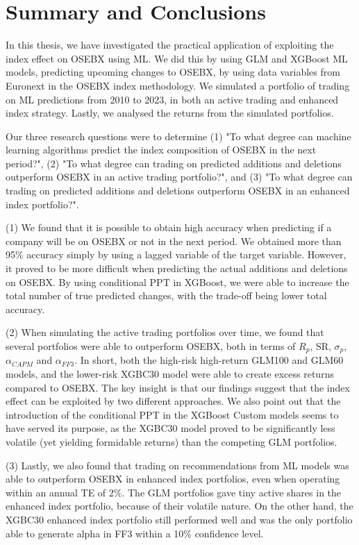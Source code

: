 \section{Summary and Conclusions}
\label{Summary and conclusions}

In this thesis, we have investigated the practical application of exploiting the index effect on OSEBX using ML. We did this by using GLM and XGBoost ML models, predicting upcoming changes to OSEBX, by using data variables from Euronext in the OSEBX index methodology. We simulated a portfolio of trading on ML predictions from 2010 to 2023, in both an active trading and enhanced index strategy. Lastly, we analysed the returns from the simulated portfolios.

Our three research questions were to determine (1) "To what degree can machine learning algorithms predict the index composition of OSEBX in the next period?", (2) "To what degree can trading on predicted additions and deletions outperform OSEBX in an active trading portfolio?", and (3) "To what degree can trading on predicted additions and deletions outperform OSEBX in an enhanced index portfolio?". 

(1) We found that it is possible to obtain high accuracy when predicting if a company will be on OSEBX or not in the next period. We obtained more than 95\% accuracy simply by using a lagged variable of the target variable. However, it proved to be more difficult when predicting the actual additions and deletions on OSEBX. By using conditional PPT in XGBoost, we were able to increase the total number of true predicted changes, with the trade-off being lower total accuracy. 

(2) When simulating the active trading portfolios over time, we found that several portfolios were able to outperform OSEBX, both in terms of $R_p$, SR, $\sigma_p$, $\alpha_{CAPM}$ and $\alpha_{FF3}$. In short, both the high-risk high-return GLM100 and GLM60 models, and the lower-risk XGBC30 model were able to create excess returns compared to OSEBX. The key insight is that our findings suggest that the index effect can be exploited by two different approaches. We also point out that the introduction of the conditional PPT in the XGBoost Custom models seems to have served its purpose, as the XGBC30 model proved to be significantly less volatile (yet yielding formidable returns) than the competing GLM portfolios.

(3) Lastly, we also found that trading on recommendations from ML models was able to outperform OSEBX in enhanced index portfolios, even when operating within an annual TE of 2\%. The GLM portfolios gave tiny active shares in the enhanced index portfolio, because of their volatile nature. On the other hand, the XGBC30 enhanced index portfolio still performed well and was the only portfolio able to generate alpha in FF3 within a 10\% confidence level. 

